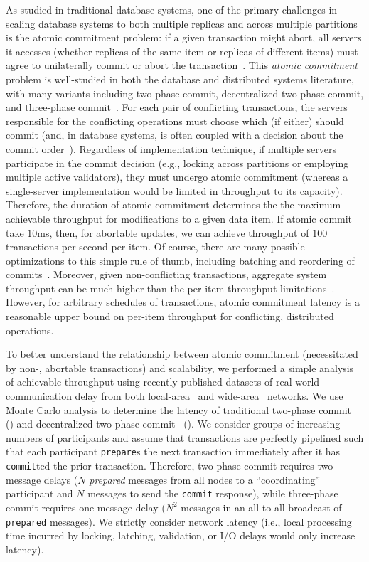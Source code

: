 As studied in traditional database systems, one of the primary
challenges in scaling database systems to both multiple replicas and
across multiple partitions is the atomic commitment problem: if a
given transaction might abort, all servers it accesses (whether
replicas of the same item or replicas of different items) must agree
to unilaterally commit or abort the
transaction~\cite{bernstein-book}. This \textit{atomic commitment}
problem is well-studied in both the database and distributed systems
literature, with many variants including two-phase commit,
decentralized two-phase commit, and three-phase
commit~\cite{atomictransactions,paxos-commit,traiger-tods}. For each
pair of conflicting transactions, the servers responsible for the
conflicting operations must choose which (if either) should commit
(and, in database systems, is often coupled with a decision about the
commit order~\cite{hat-vldb,calvin,traiger-tods}). Regardless of
implementation technique, if multiple servers participate in the
commit decision (e.g., locking across partitions or employing multiple
active validators), they must undergo atomic commitment (whereas a
single-server implementation would be limited in throughput to its
capacity). Therefore, the duration of atomic commitment determines the
the maximum achievable throughput for modifications to a given data
item. If atomic commit take $10$ms, then, for abortable updates, we
can achieve throughput of $100$ transactions per second per item. Of
course, there are many possible optimizations to this simple rule of
thumb, including batching and reordering of
commits~\cite{calvin}. Moreover, given non-conflicting transactions,
aggregate system throughput can be much higher than the per-item
throughput limitations~\cite{spanner, f1}. However, for arbitrary
schedules of transactions, atomic commitment latency is a reasonable
upper bound on per-item throughput for conflicting, distributed
operations.

To better understand the relationship between atomic commitment
(necessitated by non-\iconfluent, abortable transactions) and
scalability, we performed a simple analysis of achievable throughput
using recently published datasets of real-world communication delay
from both local-area~\cite{bobtail} and wide-area~\cite{hat-vldb}
networks. We use Monte Carlo analysis to determine the latency of
traditional two-phase commit~\cite{bernstein-book} (\dpc) and
decentralized two-phase commit~\cite{paxos-commit} (\cpc). We consider
groups of increasing numbers of participants and assume that
transactions are perfectly pipelined such that each participant
\texttt{prepare}s the next transaction immediately after it has
\texttt{commit}ted the prior transaction. Therefore, two-phase commit
requires two message delays ($N$ \textit{prepared} messages from all
nodes to a ``coordinating'' participant and $N$ messages to send the
\texttt{commit} response), while three-phase commit requires one
message delay ($N^2$ messages in an all-to-all broadcast of
\texttt{prepared} messages). We strictly consider network latency
(i.e., local processing time incurred by locking, latching,
validation, or I/O delays would only increase latency).

